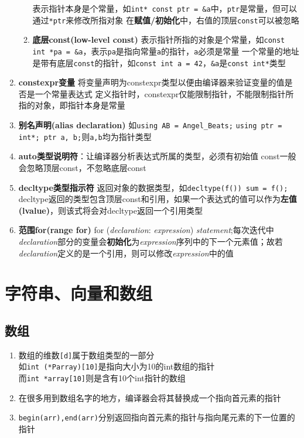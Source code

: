 \documentclass[10pt]{article}
\begin{document}
\begin{enumerate}
\begin{enumerate}
    \subitem 表示指针本身是个常量，如\texttt{int* const ptr = \&a}中，\texttt{ptr}是常量，但可以通过\texttt{*ptr}来修改所指对象
    \subitem 在\textbf{赋值/初始化}中，右值的顶层\texttt{const}可以被忽略
    \item \textbf{底层const(low-level const)}
    \subitem 表示指针所指的对象是个常量，如\texttt{const int *pa = \&a}，表示\texttt{pa}是指向常量\texttt{a}的指针，\texttt{a}必须是常量
    \subitem 一个常量的地址是带有底层\texttt{const}的指针，如\texttt{const int a = 42}，\texttt{\&a}是\texttt{const int*}类型
  \end{enumerate}
  \item \textbf{constexpr变量}
  \subitem 将变量声明为constexpr类型以便由编译器来验证变量的值是否是一个常量表达式
  \subitem 定义指针时，constexpr仅能限制指针，不能限制指针所指的对象，即指针本身是常量
  \item \textbf{别名声明(alias declaration)}
  \subitem 如\texttt{using AB = Angel\_Beats;}
  \subitem \texttt{using ptr = int*; ptr a, b;}则\texttt{a,b}均为指针类型
  \item \textbf{auto类型说明符}：让编译器分析表达式所属的类型，必须有初始值
  \subitem const一般会忽略顶层const，不忽略底层const
  \item \textbf{decltype类型指示符}
  \subitem 返回对象的数据类型，如\texttt{decltype(f()) sum = f();}
  \subitem decltype返回的类型包含顶层const和引用，如果一个表达式的值可以作为\textbf{左值(lvalue)}，则该式将会对decltype返回一个引用类型
  \item \textbf{范围for(range for)}
  \subitem for (\textsl{declaration}: \textsl{expression}) \textsl{statement};每次迭代中\textsl{declaration}部分的变量会\textbf{初始化}为\textsl{expression}序列中的下一个元素值；故若\textsl{declaration}定义的是一个引用，则可以修改\textsl{expression}中的值
\end{enumerate}
\section{字符串、向量和数组}
\subsection{数组}
\begin{enumerate}
  \item 数组的维数\texttt{[d]}属于数组类型的一部分\\如\texttt{int (*Parray)[10]}是指向大小为10的int数组的指针\\而\texttt{int *array[10]}则是含有10个int指针的数组
  \item 在很多用到数组名字的地方，编译器会将其替换成一个指向首元素的指针
  \item \texttt{begin(arr),end(arr)}分别返回指向首元素的指针与指向尾元素的下一位置的指针
\end{enumerate}
\end{document}
